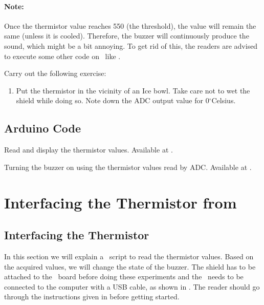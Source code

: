 \begin{enumerate}
        \paragraph{Note:} Once the thermistor value reaches 550 (the threshold), the value will remain the same
        (unless it is cooled). Therefore, the buzzer will continuously produce the sound, which might be
        a bit annoying. To get rid of this, the readers are advised to
        execute some other code on \arduino\ like .

\end{enumerate}

\begin{exercise}
  Carry out the following exercise:
  \begin{enumerate}
    \item Put the thermistor in the vicinity of an Ice bowl. Take care not
          to wet the shield while doing so. Note down the ADC output value for
          0$^{\circ}$Celsius.
  \end{enumerate}
\end{exercise}

\subsection{Arduino Code}
\label{sec:therm-arduino-code}

\begin{ardcode}
   {Read and display
    the thermistor values.  Available at
    .}
  \label{ard:therm-read}
  
\end{ardcode}

\begin{ardcode}
  {Turning the buzzer on using the thermistor values read by
    ADC.  Available at
    .}
  \label{ard:therm-buzzer}
  
\end{ardcode}

\section{Interfacing the Thermistor from \scilab}
\subsection{Interfacing the Thermistor}
In this section we will explain a \scilab\ script to read the thermistor
values. Based on the acquired values, we will change
the state of the buzzer.  The shield has to be attached to the \arduino\ board
before doing these experiments and the \arduino\ needs to be connected to the computer
with a USB cable, as shown in .
The reader should go through the instructions given in
 before getting started.

